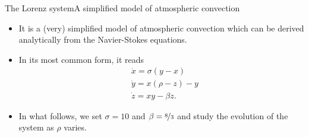\documentclass[usenames,dvipsnames,svgnames,10pt,aspectratio=169]{beamer}
\begin{document}
\begin{frame}[t, c]{The Lorenz system}{A simplified model of atmospheric convection}
	\begin{minipage}{.58\textwidth}
		\begin{itemize}
			\item It is a (very) simplified model of atmospheric convection which can be derived analytically from the Navier-Stokes equations.

			\bigskip

			\item In its most common form, it reads
			\[
				\begin{aligned}
					& \dot{x} = \sigma ( y - x ) \\
					& \dot{y} = x (\rho - z) - y \\
					& \dot{z} = xy - \beta z.
				\end{aligned}
			\]

			\medskip

			\item In what follows, we set \( \sigma = 10 \) and \( \beta = \nicefrac{8}{3} \) and study the evolution of the system as \( \rho \) varies.
		\end{itemize}
	\end{minipage}%
	\hfill
	\begin{minipage}{.38\textwidth}
		\centering
	\end{minipage}

	\vspace{1cm}
\end{frame}
\end{document}
